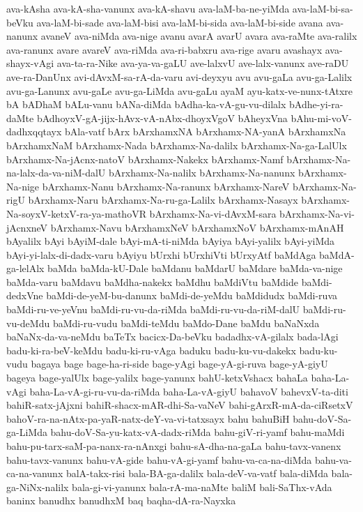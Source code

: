 {ava-kAsha
ava-kA-sha-vanunx
ava-kA-shavu
ava-laM-ba-ne-yiMda
ava-laM-bi-sa-beVku
ava-laM-bi-sade
ava-laM-bisi
ava-laM-bi-sida
ava-laM-bi-side
avana
ava-nanunx
avaneV
ava-niMda
ava-nige
avanu
avarA
avarU
avara
ava-raMte
ava-ralilx
ava-ranunx
avare
avareV
ava-riMda
ava-ri-babxru
ava-rige
avaru
avashayx
ava-shayx-vAgi
ava-ta-ra-Nike
ava-ya-va-gaLU
ave-lalxvU
ave-lalx-vanunx
ave-raDU
ave-ra-DanUnx
avi-dAvxM-sa-rA-da-varu
avi-deyxyu
avu
avu-gaLa
avu-ga-Lalilx
avu-ga-Lanunx
avu-gaLe
avu-ga-LiMda
avu-gaLu
ayaM
ayu-katx-ve-nunx-tAtxre
bA
bADhaM
bALu-vanu
bANa-diMda
bAdha-ka-vA-gu-vu-dilalx
bAdhe-yi-ra-daMte
bAdhoyxV-gA-jijx-hAvx-vA-nAbx-dhoyxVgoV
bAheyxVna
bAhu-mi-voV-dadhxqqtayx
bAla-vatf
bArx
bArxhamxNA
bArxhamx-NA-yanA
bArxhamxNa
bArxhamxNaM
bArxhamx-Nada
bArxhamx-Na-dalilx
bArxhamx-Na-ga-LalUlx
bArxhamx-Na-jAcnx-natoV
bArxhamx-Nakekx
bArxhamx-Namf
bArxhamx-Na-na-lalx-da-va-niM-dalU
bArxhamx-Na-nalilx
bArxhamx-Na-nanunx
bArxhamx-Na-nige
bArxhamx-Nanu
bArxhamx-Na-ranunx
bArxhamx-NareV
bArxhamx-Na-rigU
bArxhamx-Naru
bArxhamx-Na-ru-ga-Lalilx
bArxhamx-Nasayx
bArxhamx-Na-soyxV-ketxV-ra-ya-mathoVR
bArxhamx-Na-vi-dAvxM-sara
bArxhamx-Na-vi-jAcnxneV
bArxhamx-Navu
bArxhamxNeV
bArxhamxNoV
bArxhamx-mAnAH
bAyalilx
bAyi
bAyiM-dale
bAyi-mA-ti-niMda
bAyiya
bAyi-yalilx
bAyi-yiMda
bAyi-yi-lalx-di-dadx-varu
bAyiyu
bUrxhi
bUrxhiVti
bUrxyAtf
baMdAga
baMdA-ga-lelAlx
baMda
baMda-kU-Dale
baMdanu
baMdarU
baMdare
baMda-va-nige
baMda-varu
baMdavu
baMdha-nakekx
baMdhu
baMdiVtu
baMdide
baMdi-dedxVne
baMdi-de-yeM-bu-danunx
baMdi-de-yeMdu
baMdidudx
baMdi-ruva
baMdi-ru-ve-yeVnu
baMdi-ru-vu-da-riMda
baMdi-ru-vu-da-riM-dalU
baMdi-ru-vu-deMdu
baMdi-ru-vudu
baMdi-teMdu
baMdo-Dane
baMdu
baNaNxda
baNaNx-da-va-neMdu
baTeTx
bacicx-Da-beVku
badadhx-vA-gilalx
bada-lAgi
badu-ki-ra-beV-keMdu
badu-ki-ru-vAga
baduku
badu-ku-vu-dakekx
badu-ku-vudu
bagaya
bage
bage-ha-ri-side
bage-yAgi
bage-yA-gi-ruva
bage-yA-giyU
bageya
bage-yalUlx
bage-yalilx
bage-yanunx
bahU-ketxVshacx
bahaLa
baha-La-vAgi
baha-La-vA-gi-ru-vu-da-riMda
baha-La-vA-giyU
bahavoV
bahevxV-ta-diti
bahiR-satx-jAjxni
bahiR-shacx-mAR-dhi-Sa-vaNeV
bahi-gArxR-mA-da-ciRsetxV
bahoV-ra-na-nAtx-pa-yaR-natx-deY-va-vi-tatxsayx
bahu
bahuBiH
bahu-doV-Sa-ga-LiMda
bahu-doV-Sa-yu-katx-vA-dadx-riMda
bahu-giV-ri-yamf
bahu-maMdi
bahu-pu-tarx-saM-pa-nanx-ra-nAnxgi
bahu-sA-dha-na-gaLa
bahu-tavx-vanenx
bahu-tavx-vanunx
bahu-vA-gide
bahu-vA-gi-yamf
bahu-va-ca-na-diMda
bahu-va-ca-na-vanunx
balA-takx-risi
bala-BA-ga-dalilx
bala-deV-va-vatf
bala-diMda
bala-ga-NiNx-nalilx
bala-gi-vi-yanunx
bala-rA-ma-naMte
baliM
bali-SaThx-vAda
baninx
banudhx
banudhxM
baq
baqha-dA-ra-Nayxka
}
